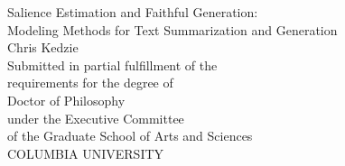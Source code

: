 
\begin{titlepage}
\begin{center}

\begin{singlespacing}
\vspace*{6\baselineskip}
Salience Estimation and Faithful Generation:\\
Modeling Methods for Text Summarization and Generation\\
\vspace{3\baselineskip}
Chris Kedzie\\
\vspace{18\baselineskip}
Submitted in partial fulfillment of the\\
requirements for the degree of\\
Doctor of Philosophy\\
under the Executive Committee\\
of the Graduate School of Arts and Sciences\\
\vspace{3\baselineskip}
COLUMBIA UNIVERSITY\\
\vspace{3\baselineskip}
\the\year
\vfill


\end{singlespacing}

\end{center}
\end{titlepage}


